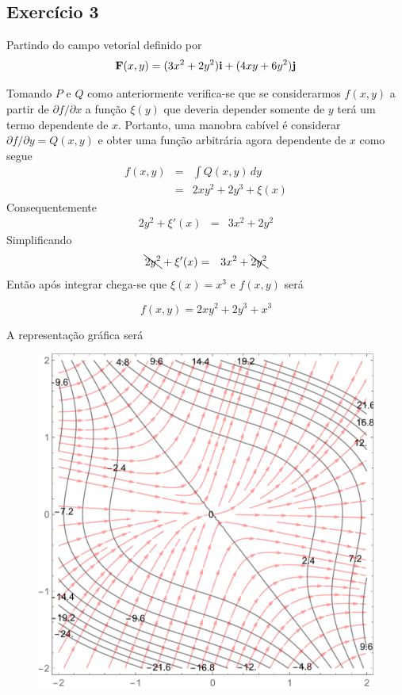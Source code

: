 \documentclass[a4paper, 12pt, brazilian]{article}
\begin{document}
	\subsection{Exercício 3}
	
	Partindo do campo vetorial definido por
	\begin{equation}
		\textbf{F} (x,y)=(3x^{2}+2y^{2})\textbf{i}+(4xy+6y^{2})\textbf{j}
	\end{equation}
	
	Tomando $P$ e $Q$ como anteriormente verifica-se que se considerarmos $f(x,y)$ a partir de $\partial f/\partial x$ a função $\xi(y)$ que deveria depender somente de $y$ terá um termo dependente de $x$. Portanto, uma manobra cabível é considerar $\partial f/\partial y=Q(x,y)$ e obter uma função arbitrária agora dependente de $x$ como segue	
	\begin{eqnarray}
		f(x,y)&=&\int Q(x,y)\,dy\\
		&=&2xy^{2}+2y^{3}+\xi(x)
	\end{eqnarray}
	Consequentemente
	\begin{eqnarray}
		2y^{2}+\xi'(x)&=&3x^{2}+2y^{2}
	\end{eqnarray}
	Simplificando
	\begin{eqnarray}
	\bcancel{2y^{2}}+\xi'(x)&=&3x^{2}+\bcancel{2y^{2}}
	\end{eqnarray}
	Então após integrar chega-se que $\xi(x)=x^{3}$ e $f(x,y)$ será
	
	\begin{equation}
		f(x,y)=2xy^{2}+2y^{3}+x^{3}
	\end{equation}
	
	A representação gráfica será
	
	\begin{figure}[H]
		\centering
		\includegraphics[width=0.7\linewidth]{images/g3}
		\label{fig:g3}
	\end{figure}
	
\end{document}
